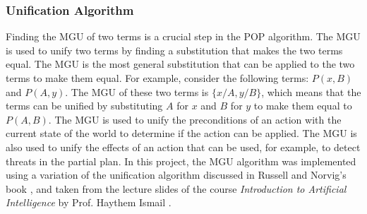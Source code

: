 \begin{itemize}
          \subsubsection{Unification Algorithm} \label{subsubsec:unification_algorithm}
          Finding the \acf{MGU} of two terms is a crucial step in the \ac{POP} algorithm. The \ac{MGU} is used to unify two terms by finding a substitution that makes the two terms equal. The \ac{MGU} is the most general substitution that can be applied to the two terms to make them equal.
          For example, consider the following terms: $P(x, B)$ and $P(A, y)$. The \ac{MGU} of these two terms is $\{x/A, y/B\}$, which means that the terms can be unified by substituting $A$ for $x$ and $B$ for $y$ to make them equal to $P(A, B)$.
          The \ac{MGU} is used to unify the preconditions of an action with the current state of the world to determine if the action can be applied. The \ac{MGU} is also used to unify the effects of an action that can be used, for example, to detect threats in the partial plan.
          In this project, the \ac{MGU} algorithm was implemented using a variation of the unification algorithm discussed in Russell and Norvig's book \cite{RN2020_Ch.9}, and taken from the lecture slides of the course \textit{Introduction to Artificial Intelligence} by Prof. Haythem Ismail \cite{Ismail2023}.

\end{itemize}

